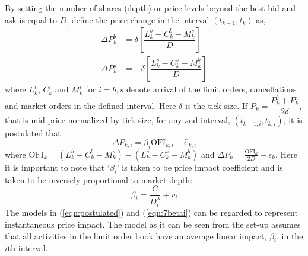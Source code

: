 By setting the number of shares (depth) or price levels beyond the best bid and ask is equal to $D$, define the price change in the interval $(t_{k-1},t_k)$ as,
	\begin{equation}\label{eqn:doubleeq}
	\begin{split}
	\Delta P_k^b&= \delta \left[ \dfrac{L_k^b - C_k^b - M_k^s}{D} \right] \\
	\Delta P_k^s&= -\delta \left[\dfrac{L_k^s-C_k^s-M_k^b}{D}\right]
	\end{split}
	\end{equation}
where $L_k^i$, $C_k^i$ and $M_k^i$ for $i=b,s$ denote arrival of the limit orders, cancellations and market orders in the defined interval. Here $\delta$ is the tick size. If $P_k=\dfrac{P_k^b+P_k^s}{2\delta}$, that is mid-price normalized by tick size, for any $s$nd-interval, $(t_{k-1,i},t_{k,i})$, it is postulated that
	\begin{equation}\label{eqn:postulated}
	\Delta P_{k,i} = \beta_i \text{OFI}_{k,i} + \Eulerconst_{k,i}
	\end{equation}
where $\text{OFI}_k=(L_k^b-C_k^b-M_k^s)-(L_k^s-C_k^s-M_k^b)$ and $\Delta P_k=\frac{\text{OFI}_k}{2D}+\epsilon_k$. Here it is important to note that `$\beta_i$' is taken to be price impact coefficient and is taken to be inversely proportional to market depth:
	\begin{equation}\label{eqn:7betai}
	\beta_i=\dfrac{C}{D_i^\lambda} + v_i
	\end{equation}
The models in (\ref{eqn:postulated}) and (\ref{eqn:7betai}) can be regarded to represent instantaneous price impact. The model as it can be seen from the set-up assumes that all activities in the limit order book have an average linear impact, $\beta_i$, in the $i$th interval. 


